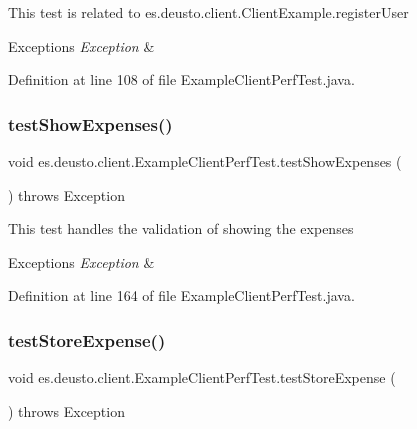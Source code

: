 This test is related to es.\+deusto.\+client.\+Client\+Example.\+register\+User ~\newline

\begin{DoxyExceptions}{Exceptions}
{\em Exception} & \\
\hline
\end{DoxyExceptions}


Definition at line 108 of file Example\+Client\+Perf\+Test.\+java.

\mbox{\label{classes_1_1deusto_1_1client_1_1_example_client_perf_test_ac26b0d5a7e84222f7372cc1783b3f6bb}} 
\subsubsection{\texorpdfstring{test\+Show\+Expenses()}{testShowExpenses()}}
{\footnotesize\ttfamily void es.\+deusto.\+client.\+Example\+Client\+Perf\+Test.\+test\+Show\+Expenses (\begin{DoxyParamCaption}{ }\end{DoxyParamCaption}) throws Exception}

This test handles the validation of showing the expenses 
\begin{DoxyExceptions}{Exceptions}
{\em Exception} & \\
\hline
\end{DoxyExceptions}


Definition at line 164 of file Example\+Client\+Perf\+Test.\+java.

\mbox{\label{classes_1_1deusto_1_1client_1_1_example_client_perf_test_a41075a3592cd640cf42490074c26bb41}} 
\subsubsection{\texorpdfstring{test\+Store\+Expense()}{testStoreExpense()}}
{\footnotesize\ttfamily void es.\+deusto.\+client.\+Example\+Client\+Perf\+Test.\+test\+Store\+Expense (\begin{DoxyParamCaption}{ }\end{DoxyParamCaption}) throws Exception}


